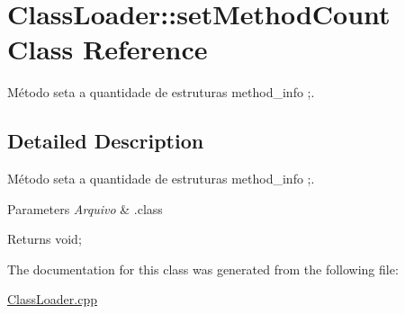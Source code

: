\hypertarget{class_class_loader_1_1set_method_count}{}\section{Class\+Loader\+:\+:set\+Method\+Count Class Reference}
\label{class_class_loader_1_1set_method_count}


Método seta a quantidade de estruturas method\+\_\+info ;.  




\subsection{Detailed Description}
Método seta a quantidade de estruturas method\+\_\+info ;. 


\begin{DoxyParams}{Parameters}
{\em Arquivo} & .class \\
\hline
\end{DoxyParams}
\begin{DoxyReturn}{Returns}
void; 
\end{DoxyReturn}


The documentation for this class was generated from the following file\+:\begin{DoxyCompactItemize}
\item 
\hyperlink{_class_loader_8cpp}{Class\+Loader.\+cpp}\end{DoxyCompactItemize}

